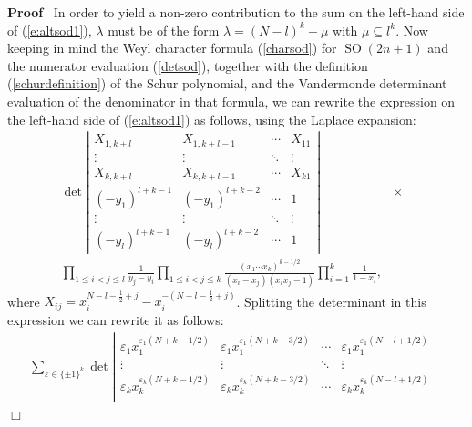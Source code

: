 \documentclass[11pt]{amsart}
\newcommand{\tmop}[1]{\ensuremath{\operatorname{#1}}}
\renewenvironment{proof}{
\noindent\textbf{Proof}\ }{\hspace*{\fill}
\begin{math}\Box\end{math}\medskip}
\begin{document}
\begin{proof}
  In order to yield a non-zero contribution to the sum on the left-hand side
  of (\ref{e:altsod1}), $\lambda$ must be of the form $\lambda = ( N - l )^k +
  \mu$ with $\mu \subseteq l^k$. Now keeping in mind the Weyl character
  formula (\ref{charsod}) for $\tmop{SO} ( 2 n + 1 )$  and the numerator
  evaluation (\ref{detsod}), together with the definition
  (\ref{schurdefinition}) of the Schur polynomial, and the Vandermonde
  determinant evaluation of the denominator in that formula, we can rewrite
  the expression on the left-hand side of (\ref{e:altsod1}) as follows, using
  the Laplace expansion:
  \begin{eqnarray}
    \det \left| \begin{array}{cccc}
     X_{1, k + l} & X_{1, k+l-1} & \cdots & X_{11}\\
      \vdots & \vdots & \ddots & \vdots\\
      X_{k, k+l} & X_{k, k+l-1} & \cdots & X_{k1}\\
      ( - y_1 )^{l + k - 1} & ( - y_1 )^{l + k - 2}& \cdots & 1\\
      \vdots & \vdots & \ddots & \vdots\\
      ( - y_l )^{l + k - 1} & ( - y_l )^{l + k - 2}& \cdots & 1
    \end{array} \right| & \times &  \nonumber\\
    \prod_{1 \leqslant i < j \leqslant l} \frac{1}{y_j - y_i} \prod_{1
    \leqslant i < j \leqslant k} \frac{( x_1 \cdots x_k )^{k - 1 / 2}}{( x_i -
    x_j ) ( x_i x_j - 1 )} \prod_{i = 1}^k \frac{1}{1 - x_i}, &  &
    \label{e:detsod2}
  \end{eqnarray}
\medbreak\noindent
  where $X_{i j} = x_i^{N - l - \frac{1}{2} + j} - x_i^{- ( N - l - \frac{1}{2} +  j )}$.
  Splitting the determinant in this expression we can rewrite it as follows:
  \begin{eqnarray*}
    \sum_{\varepsilon \in \{ \pm 1 \}^k} \det \left| \begin{array}{ccccc}
      \varepsilon_1 x_1^{\varepsilon_1 ( N+k- 1 / 2 )} & \varepsilon_1
      x_1^{\varepsilon_1 ( N+k-3 / 2 )} & \cdots & \varepsilon_1
      x_1^{\varepsilon_1 ( N -l+ 1 / 2 )} & \\
      \vdots & \vdots & \ddots & \vdots & \\
      \varepsilon_k x_k^{\varepsilon_k ( N+k-1 / 2 )} & \varepsilon_k
      x_k^{\varepsilon_k ( N+k-3 / 2 )} & \cdots & \varepsilon_k
      x_k^{\varepsilon_k ( N-l+1 / 2 )} & \\

\end{array}
\end{eqnarray*}
\end{proof}
\end{document}
